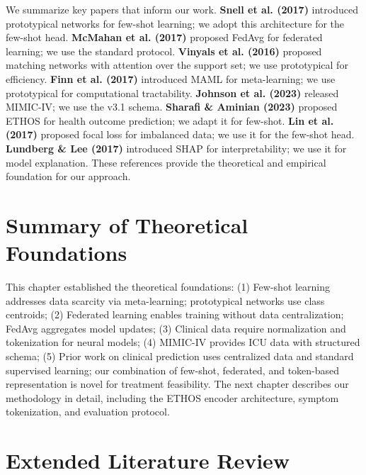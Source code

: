 We summarize key papers that inform our work. \textbf{Snell et al. (2017)} introduced prototypical networks for few-shot learning; we adopt this architecture for the few-shot head. \textbf{McMahan et al. (2017)} proposed FedAvg for federated learning; we use the standard protocol. \textbf{Vinyals et al. (2016)} proposed matching networks with attention over the support set; we use prototypical for efficiency. \textbf{Finn et al. (2017)} introduced MAML for meta-learning; we use prototypical for computational tractability. \textbf{Johnson et al. (2023)} released MIMIC-IV; we use the v3.1 schema. \textbf{Sharafi \& Aminian (2023)} proposed ETHOS for health outcome prediction; we adapt it for few-shot. \textbf{Lin et al. (2017)} proposed focal loss for imbalanced data; we use it for the few-shot head. \textbf{Lundberg \& Lee (2017)} introduced SHAP for interpretability; we use it for model explanation. These references provide the theoretical and empirical foundation for our approach.

\section{Summary of Theoretical Foundations}

This chapter established the theoretical foundations: (1) Few-shot learning addresses data scarcity via meta-learning; prototypical networks use class centroids; (2) Federated learning enables training without data centralization; FedAvg aggregates model updates; (3) Clinical data require normalization and tokenization for neural models; (4) MIMIC-IV provides ICU data with structured schema; (5) Prior work on clinical prediction uses centralized data and standard supervised learning; our combination of few-shot, federated, and token-based representation is novel for treatment feasibility. The next chapter describes our methodology in detail, including the ETHOS encoder architecture, symptom tokenization, and evaluation protocol.

\section{Extended Literature Review}

